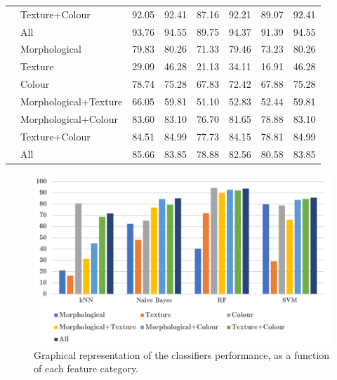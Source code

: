 \documentclass[twocolumn]{svjour3}           %
\begin{document}
\begin{table}[tbhp]
\begin{tabular}{lllccccc}
		&Texture+Colour & 92.05 & 92.41 & 87.16 & 92.21 & 89.07 & 92.41 \\ 
		&All & 93.76 & 94.55 & 89.75 & 94.37 & 91.39 & 94.55 \\ 
		\midrule
		\multirow{7}{*}{\rotatebox[origin=c]{0}{SVM}}
		&Morphological & 79.83 & 80.26 & 71.33 & 79.46 & 73.23 & 80.26 \\
		&Texture & 29.09 & 46.28 & 21.13 & 34.11 & 16.91 & 46.28 \\
		&Colour & 78.74 & 75.28 & 67.83 & 72.42 & 67.88 & 75.28 \\
		&Morphological+Texture & 66.05 & 59.81 & 51.10 & 52.83 & 52.44 & 59.81 \\
		&Morphological+Colour & 83.60 & 83.10 & 76.70 & 81.65 & 78.88 & 83.10 \\
		&Texture+Colour & 84.51 & 84.99 & 77.73 & 84.15 & 78.81 & 84.99 \\
		&All & 85.66 & 83.85 & 78.88 & 82.56 & 80.58 & 83.85 \\ 
		\bottomrule
	\end{tabular}
	\label{tab:classicClassification}
\end{table}


\begin{figure}[tbhp]
	\centering
	\includegraphics[scale=0.60]{fig_g1.png}
	\caption{Graphical representation of the classifiers performance, as a function of each feature category.}
	\label{fig:g1}
\end{figure}
\end{document}
